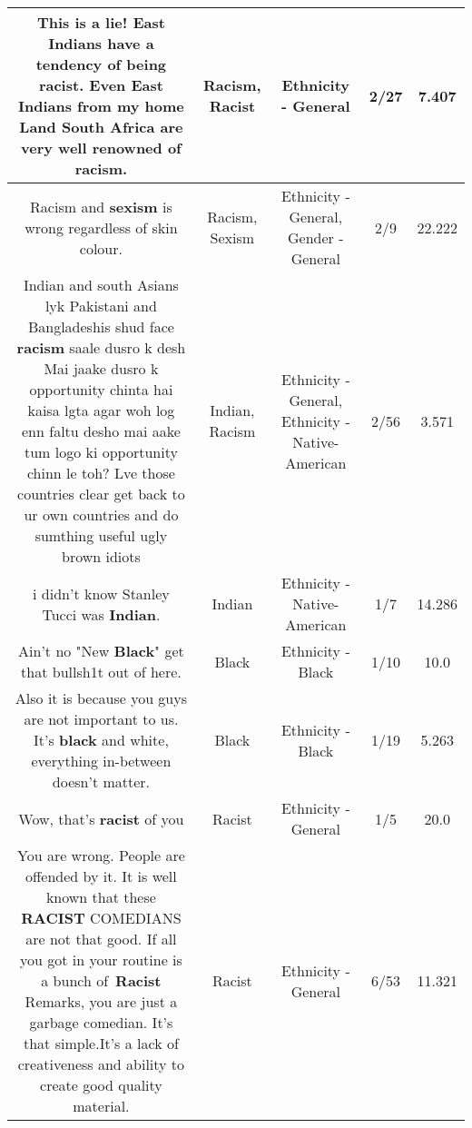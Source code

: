 \documentclass[11pt]{article}
\newlength\mylength
\begin{document}
\begin{center}
\begin{longtable}{|C{.65\mylength}|C{.30\mylength}|C{.12\mylength}|C{.12\mylength}|C{.12\mylength}|}
  \small This is a lie! East Indians have a tendency of being \textbf{racist}. Even East Indians from my home Land South Africa are very well renowned of \textbf{racism}.\normalsize   & Racism, Racist & Ethnicity - General & 2/27 & 7.407 \\  \hline
  \small Racism and \textbf{sexism} is wrong regardless of skin colour.\normalsize   & Racism, Sexism & Ethnicity - General, Gender - General & 2/9 & 22.222 \\  \hline
  \small Indian and south Asians lyk Pakistani and Bangladeshis shud face \textbf{racism} saale dusro k desh Mai jaake dusro k opportunity chinta hai kaisa lgta agar woh log enn faltu desho mai aake tum logo ki opportunity chinn le toh? Lve those countries clear get back to ur own countries and do sumthing useful ugly brown idiots\normalsize   & Indian, Racism & Ethnicity - General, Ethnicity - Native-American & 2/56 & 3.571 \\  \hline
  \small i didn't know Stanley Tucci was \textbf{Indian}.\normalsize   & Indian & Ethnicity - Native-American & 1/7 & 14.286 \\  \hline
  \small Ain't no "New \textbf{Black}" get that bullsh1t out of here.\normalsize   & Black & Ethnicity - Black & 1/10 & 10.0 \\  \hline
  \small Also it is because you guys are not important to us. It's \textbf{black} and white, everything in-between doesn't matter.\normalsize   & Black & Ethnicity - Black & 1/19 & 5.263 \\  \hline
  \small Wow, that's \textbf{racist} of you\normalsize   & Racist & Ethnicity - General & 1/5 & 20.0 \\  \hline
  \small You are wrong. People are offended by it. It is well known that these \textbf{RACIST} COMEDIANS are not that good. If all you got in your routine is a bunch of \textbf{Racist} Remarks, you are just a garbage comedian. It's that simple.It's a lack of creativeness and ability to create good quality material.\normalsize   & Racist & Ethnicity - General & 6/53 & 11.321 \\  \hline

\end{longtable}
\end{center}
\end{document}
